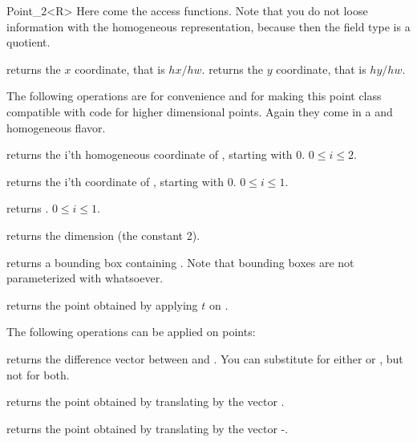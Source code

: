 \begin{ccRefClass} {Point_2<R>}
Here come the  access functions. Note that you do not loose
information with the homogeneous representation, because then the field
type is a quotient.

       {returns the  $x$ coordinate, that is $hx/hw$.}
\ccGlue
{}
       {returns the  $y$ coordinate, that is $hy/hw$.}


The following operations are for convenience and for making this
point class compatible with code for higher dimensional points.
Again they come in a  and homogeneous flavor.

       {returns the i'th homogeneous coordinate of \ccVar, starting with 0.
        \ccPrecond $0\leq i \leq 2$.}

       {returns the i'th  coordinate of \ccVar, starting with 0.
        \ccPrecond $0\leq i \leq 1$.}

       {returns .
        \ccPrecond $0\leq i \leq 1$.}

       {returns the dimension (the constant 2).}

       {returns a bounding box containing \ccVar. Note that bounding boxes
        are not parameterized with whatsoever. }

       {returns the point obtained by applying $t$ on \ccVar.}



The following operations can be applied on points:

       {returns the difference vector between  and . 
        You can substitute  for either  or ,
        but not for both.}

       {returns the point obtained by translating  by the 
        vector .}

       {returns the point obtained by translating  by the 
        vector -.}


\end{ccRefClass}
